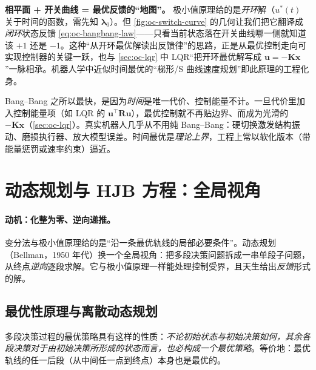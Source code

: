 \begin{insight}
\textbf{相平面 + 开关曲线 = 最优反馈的“地图”。}\; 极小值原理给的是\emph{开环}解（$u^*(t)$ 关于时间的函数，需先知 $\boldsymbol\lambda_0$）。但 \cref{fig:oc-switch-curve} 的几何让我们把它翻译成\emph{闭环}状态反馈 \cref{eq:oc-bangbang-law}——只看当前状态落在开关曲线哪一侧就知道该 $+1$ 还是 $-1$。这种“从开环最优解读出反馈律”的思路，正是从最优控制走向可实现控制器的关键一跃，也与 \cref{sec:oc-lqr} 中 LQR“把开环最优解写成 $\mathbf u=-\mathbf K\mathbf x$”一脉相承。机器人学中近似时间最优的“梯形/S 曲线速度规划”即此原理的工程化身。
\end{insight}

\begin{pitfall}
Bang--Bang 之所以最快，是因为\emph{时间}是唯一代价、控制能量不计。一旦代价里加入控制能量项（如 LQR 的 $\mathbf u^\top\mathbf R\mathbf u$），最优控制就不再贴边界、而成为光滑的 $-\mathbf K\mathbf x$（\cref{sec:oc-lqr}）。真实机器人几乎从不用纯 Bang--Bang：硬切换激发结构振动、磨损执行器、放大模型误差。时间最优是\emph{理论上界}，工程上常以软化版本（带能量惩罚或速率约束）逼近。
\end{pitfall}

\section{动态规划与 HJB 方程：全局视角}
\label{sec:oc-dp}

\paragraph{动机：化整为零、逆向递推。}
变分法与极小值原理给的是“沿一条最优轨线的局部必要条件”。动态规划（Bellman，1950 年代）换一个全局视角：把多段决策问题拆成一串单段子问题，从终点\emph{逆向}逐段求解\cite{bellman1957dynamic,liubao2006modern}。它与极小值原理一样能处理控制受界，且天生给出\emph{反馈}形式的解。

\subsection{最优性原理与离散动态规划}
\label{sec:oc-dp-discrete}

\begin{theorem}\label{thm:oc-bellman-principle}
多段决策过程的最优策略具有这样的性质：\emph{不论初始状态与初始决策如何，其余各段决策对于由初始决策所形成的状态而言，也必构成一个最优策略}。等价地：最优轨线的任一后段（从中间任一点到终点）本身也是最优的。
\end{theorem}

